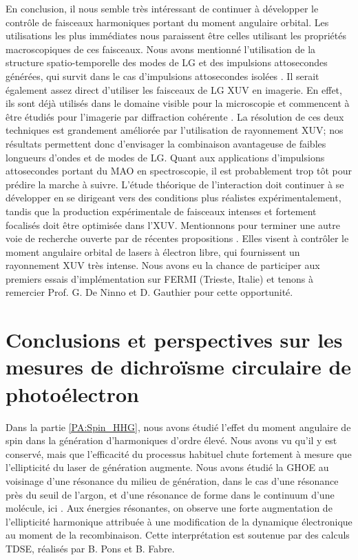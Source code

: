 En conclusion, il nous semble très intéressant de continuer à développer le contrôle de faisceaux harmoniques portant du moment angulaire orbital. Les utilisations les plus immédiates nous paraissent être celles utilisant les propriétés macroscopiques de ces faisceaux. Nous avons mentionné l'utilisation de la structure spatio-temporelle des modes de LG et des impulsions attosecondes générées, qui survit dans le cas d'impulsions attosecondes isolées . Il serait également assez direct d'utiliser les faisceaux de LG XUV en imagerie. En effet, ils sont déjà utilisés dans le domaine visible pour la microscopie  et commencent à être étudiés pour l'imagerie par diffraction cohérente . La résolution de ces deux techniques est grandement améliorée par l'utilisation de rayonnement XUV; nos résultats permettent donc d'envisager la combinaison avantageuse de faibles longueurs d'ondes et de modes de LG. \linebreak
Quant aux applications d'impulsions attosecondes portant du MAO en spectroscopie, il est probablement trop tôt pour prédire la marche à suivre. L'étude théorique de l'interaction doit continuer à se développer en se dirigeant vers des conditions plus réalistes expérimentalement, tandis que la production expérimentale de faisceaux intenses et fortement focalisés doit être optimisée dans l'XUV. Mentionnons pour terminer une autre voie de recherche ouverte par de récentes propositions . Elles visent à contrôler le moment angulaire orbital de lasers à électron libre, qui fournissent un rayonnement XUV très intense. Nous avons eu la chance de participer aux premiers essais d'implémentation sur FERMI (Trieste, Italie) et tenons à remercier Prof. G. De Ninno et D. Gauthier pour cette opportunité.

\section{Conclusions et perspectives sur les mesures de dichroïsme circulaire de photoélectron}
Dans la partie \ref{PA:Spin_HHG}, nous avons étudié l'effet du moment angulaire de spin dans la génération d'harmoniques d'ordre élevé. Nous avons vu qu'il y est conservé, mais que l'efficacité du processus habituel chute fortement à mesure que l'ellipticité du laser de génération augmente. Nous avons étudié la GHOE au voisinage d'une résonance du milieu de génération, dans le cas d'une résonance près du seuil de l'argon, et d'une résonance de forme dans le continuum d'une molécule, ici . Aux énergies résonantes, on observe une forte augmentation de l'ellipticité harmonique attribuée à une modification de la dynamique électronique au moment de la recombinaison. Cette interprétation est soutenue par des calculs TDSE, réalisés par B. Pons et B. Fabre. 

